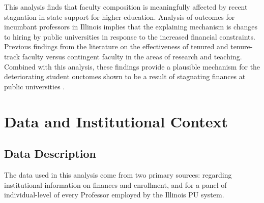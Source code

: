 \documentclass[notitlepage,12pt]{article}
\begin{document}
This analysis finds that faculty composition is meaningfully affected by recent stagnation in state support for higher education.
Analysis of outcomes for incumbant professors in Illinois implies that the explaining mechanism is changes to hiring by public universities in response to the increased financial constraints.
Previous findings from the literature on the effectiveness of tenured and tenure-track faculty versus contingent faculty in the areas of research and teaching.
Combined with this analysis, these findings provide a plausible mechanism for the deteriorating student ouctomes shown to be a result of stagnating finances at public universities \citep{NBERw23736,NBERw27885}.

%        
%        
%        


\section{Data and Institutional Context}
\label{sec:data}

\subsection{Data Description}
The data used in this analysis come from two primary sources: \citet[IPEDS]{ipeds} regarding institutional information on finances and enrollment, and \citet[IBHED]{ibhed} for a panel of individual-level of every Professor employed by the Illinois PU system.
\end{document}
